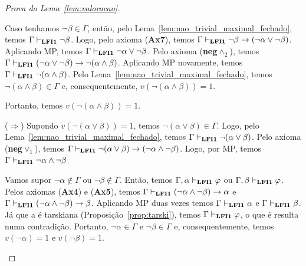 \begin{proof}[Prova do Lema~\ref{lem:valoracao}]
\begin{provaporcasos}
\begin{adjustwidth}{1cm}{}
                        \noindent Caso tenhamos $\neg \beta \in \Gamma$, então, pelo Lema~\ref{lem:nao_trivial_maximal_fechado}, temos $\Gamma \vdash_{{\normalfont\textbf{LFI1}}{}} \neg \beta$. Logo, pelo axioma (\textbf{Ax7}), temos $\Gamma \vdash_{{\normalfont\textbf{LFI1}}{}} \neg \beta \to (\neg \alpha \lor \neg \beta)$. Aplicando MP, temos $\Gamma \vdash_{{\normalfont\textbf{LFI1}}{}} \neg \alpha \lor \neg \beta$. Pelo axioma (\textbf{neg}$\land_2$), temos $\Gamma \vdash_{{\normalfont\textbf{LFI1}}{}} (\neg \alpha \lor \neg \beta) \to \neg (\alpha \land \beta)$. Aplicando MP novamente, temos $\Gamma \vdash_{{\normalfont\textbf{LFI1}}{}} \neg (\alpha \land \beta)$. Pelo Lema~\ref{lem:nao_trivial_maximal_fechado}, temos $\neg (\alpha \land \beta) \in \Gamma$ e, consequentemente, $v(\neg (\alpha \land \beta)) = 1$.

                        Portanto, temos $v(\neg (\alpha \land \beta)) = 1$.

                    \end{adjustwidth}


                    \begin{adjustwidth}{1cm}{}
                        
                        \noindent ($\Longrightarrow$) Supondo $v(\neg (\alpha \lor \beta)) = 1$, temos $\neg (\alpha \lor \beta) \in \Gamma$. Logo, pelo Lema~\ref{lem:nao_trivial_maximal_fechado}, temos $\Gamma \vdash_{{\normalfont\textbf{LFI1}}{}} \neg (\alpha \lor \beta)$. Pelo axioma (\textbf{neg}$\lor_1$), temos $\Gamma \vdash_{{\normalfont\textbf{LFI1}}{}} \neg (\alpha \lor \beta) \to (\neg \alpha \land \neg \beta)$. Logo, por MP, temos $\Gamma \vdash_{{\normalfont\textbf{LFI1}}{}} \neg \alpha \land \neg \beta$.

                        \noindent Vamos supor $\neg \alpha \not \in \Gamma$ ou $\neg \beta \not \in \Gamma$. Então, temos $\Gamma, \alpha \vdash_{{\normalfont\textbf{LFI1}}{}} \varphi$ ou $\Gamma, \beta \vdash_{{\normalfont\textbf{LFI1}}{}} \varphi$. Pelos axiomas (\textbf{Ax4}) e (\textbf{Ax5}), temos $\Gamma \vdash_{{\normalfont\textbf{LFI1}}{}} (\neg \alpha \land \neg \beta) \to \alpha$ e $\Gamma \vdash_{{\normalfont\textbf{LFI1}}{}} (\neg \alpha \land \neg \beta) \to \beta$. Aplicando MP duas vezes temos $\Gamma \vdash_{{\normalfont\textbf{LFI1}}{}} \alpha$ e $\Gamma \vdash_{{\normalfont\textbf{LFI1}}{}} \beta$. Já que a \lfium{} é tarskiana (Proposição~\ref{prop:tarski}), temos $\Gamma \vdash_{{\normalfont\textbf{LFI1}}{}} \varphi$, o que é resulta numa contradição. Portanto, $\neg \alpha \in \Gamma$ e $\neg \beta \in \Gamma$ e, consequentemente, temos $v(\neg \alpha) = 1$ e $v(\neg \beta) = 1$. 
                        

\end{adjustwidth}
\end{provaporcasos}
\end{proof}
